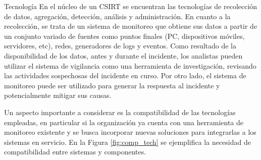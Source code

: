    \begin{section}{Tecnología}
        En el núcleo de un CSIRT se encuentran las tecnologías de recolección de datos, agregación, detección, análisis y administración. En cuanto a la recolección, se trata de un sistema de monitoreo que obtiene sus datos a partir de un conjunto variado de fuentes como puntos finales (PC, dispositivos móviles, servidores, etc), redes, generadores de logs y eventos. Como resultado de la disponibilidad de los datos, antes y durante el incidente, los analistas pueden utilizar el sistema de vigilancia como una herramienta de investigación, revisando las actividades sospechosas del incidente en curso. Por otro lado, el sistema de monitoreo puede ser utilizado para generar la respuesta al incidente y potencialmente mitigar sus causas. \par
        Un aspecto importante a considerar es la compatibilidad de las tecnologías empleadas, en particular si la organización ya cuenta con una herramienta de monitoreo existente y se busca incorporar nuevas soluciones para integrarlas a los sistemas en servicio. En la Figura \ref{fig:comp_tech} se ejemplifica la necesidad de compatibilidad entre sistemas y componentes. 
        

\end{section}
